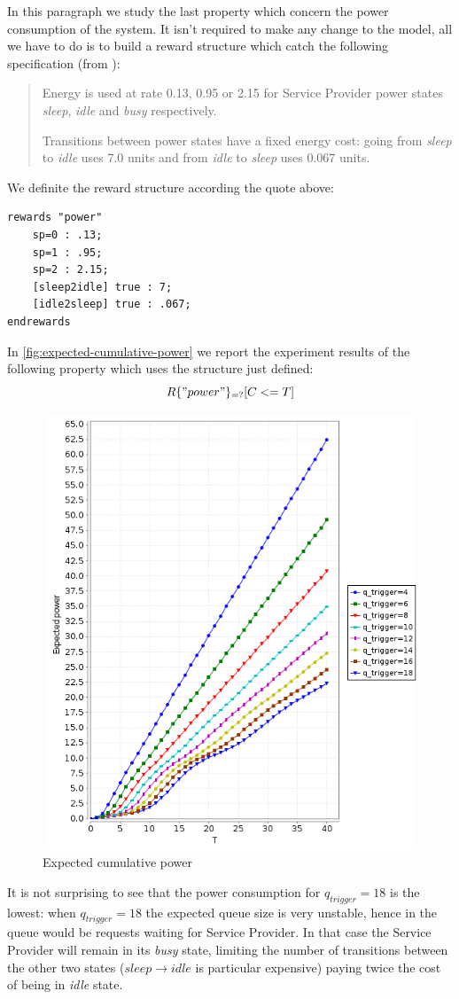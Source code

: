 In this paragraph we study the last property which concern the power
consumption of the system. It isn't required to make any change to the
model, all we have to do is to build a reward structure which catch
the following specification (from \cite{QWP99}):
\begin{quote}
  Energy is used at rate 0.13, 0.95 or 2.15 for Service Provider power
  states \emph{sleep}, \emph{idle} and \emph{busy} respectively.

  Transitions between power states have a fixed energy cost: going
  from \emph{sleep} to \emph{idle} uses 7.0 units and from \emph{idle}
  to \emph{sleep} uses 0.067 units.
\end{quote}
We definite the reward structure according the quote above:
\begin{verbatim}
rewards "power"
	sp=0 : .13;
	sp=1 : .95;
	sp=2 : 2.15;
	[sleep2idle] true : 7;
	[idle2sleep] true : .067;
endrewards
\end{verbatim}

In \autoref{fig:expected-cumulative-power} we report the experiment
results of the following property which uses the structure just
defined:
\begin{displaymath}
  R\{"power"\}_{=?} [ C<=T ]
\end{displaymath}
\begin{figure}[htb]
  \centering
  \includegraphics[width=13cm,
  height=13cm]{quantitative-project/expected-power.png}
  \caption{Expected cumulative power}
  \label{fig:expected-cumulative-power}
\end{figure}
It is not surprising to see that the power consumption for
$q_{trigger}=18$ is the lowest: when $q_{trigger} = 18$ the expected
queue size is very unstable, hence in the queue would be requests
waiting for Service Provider. In that case the Service Provider will
remain in its \emph{busy} state, limiting the number of transitions
between the other two states ($sleep \rightarrow idle$ is particular
expensive) paying twice the cost of being in \emph{idle} state.


